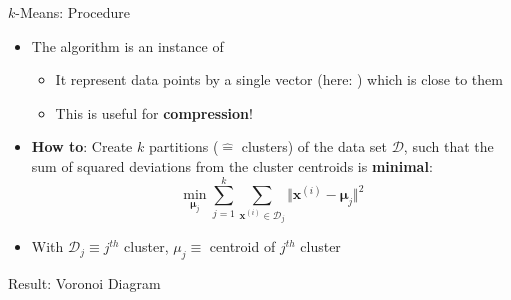 \begin{frame}{$k$-Means: Procedure}{}
	\begin{itemize}
		\item The algorithm is an instance of 
		\begin{itemize}
			\item It represent data points by a single vector (here: ) which is close to them
			\item This is useful for \textbf{compression}!
		\end{itemize}
		\item \textbf{How to}: Create $k$ partitions ($\widehat{=}$ clusters) of the data set $\mathcal{D}$, such that
			the sum of squared deviations from the cluster centroids is \textbf{minimal}:
		\begin{equation}
			\min_{\bm{\mu}_j} \sum_{j=1}^k \sum_{\bm{x}^{(i)} \in \mathcal{D}_j} \Vert \bm{x}^{(i)} - \bm{\mu}_j \Vert^2
		\end{equation}
		\item With $\mathcal{D}_j \equiv j^{th}$ cluster, $\mu_j \equiv$ centroid of $j^{th}$ cluster
	\end{itemize}
\end{frame}


\begin{frame}{Result: Voronoi Diagram}{}
\end{frame}


